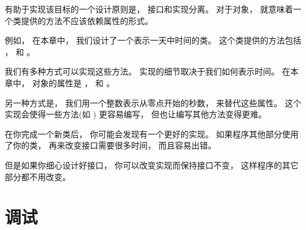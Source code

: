 有助于实现该目标的一个设计原则是， 接口和实现分离。
对于对象， 就意味着一个类提供的方法不应该依赖属性的形式。


例如， 在本章中， 我们设计了一个表示一天中时间的类。  这个类提供的方法包括
 ，  和  。


我们有多种方式可以实现这些方法。  实现的细节取决于我们如何表示时间。
在本章中，  对象的属性是  ，  和  。


另一种方式是， 我们用一个整数表示从零点开始的秒数， 来替代这些属性。
这个实现会使得一些方法(如  ) 更容易编写， 但也让编写其他方法变得更难。


在你完成一个新类后， 你可能会发现有一个更好的实现。  如果程序其他部分使用了你的类，
再来改变接口需要很多时间， 而且容易出错。


但是如果你细心设计好接口， 你可以改变实现而保持接口不变， 这样程序的其它部分都不用改变。


\section{调试}

